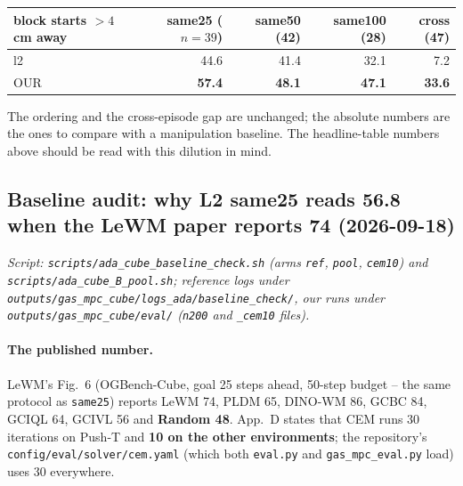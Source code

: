 \documentclass[11pt]{article}
\begin{document}
\begin{center}\small
\begin{tabular}{lrrrr}
\toprule
block starts $>4$\,cm away & same25 ($n{=}39$) & same50 (42) & same100 (28) & cross (47) \\
\midrule
l2 & 44.6 & 41.4 & 32.1 & 7.2 \\
OUR & \textbf{57.4} & \textbf{48.1} & \textbf{47.1} & \textbf{33.6} \\
\bottomrule
\end{tabular}
\end{center}

\noindent The ordering and the cross-episode gap are unchanged; the absolute numbers are the
ones to compare with a manipulation baseline. The headline-table numbers above should be
read with this dilution in mind.

\subsection{Baseline audit: why L2 same25 reads 56.8 when the LeWM paper reports 74 (2026-09-18)}
\label{sec:cube-baseline-audit}
\emph{Script: \texttt{scripts/ada\_cube\_baseline\_check.sh} (arms \texttt{ref}, \texttt{pool},
\texttt{cem10}) and \texttt{scripts/ada\_cube\_B\_pool.sh}; reference logs under
\texttt{outputs/gas\_mpc\_cube/logs\_ada/baseline\_check/}, our runs under
\texttt{outputs/gas\_mpc\_cube/eval/} (\texttt{n200} and \texttt{\_cem10} files).}

\paragraph{The published number.} LeWM's Fig.~6 (OGBench-Cube, goal 25 steps ahead, 50-step
budget -- the same protocol as \texttt{same25}) reports LeWM 74, PLDM 65, DINO-WM 86, GCBC 84,
GCIQL 64, GCIVL 56 and \textbf{Random 48}. App.~D states that CEM runs 30 iterations on Push-T
and \textbf{10 on the other environments}; the repository's \texttt{config/eval/solver/cem.yaml}
(which both \texttt{eval.py} and \texttt{gas\_mpc\_eval.py} load) uses 30 everywhere.
\end{document}
